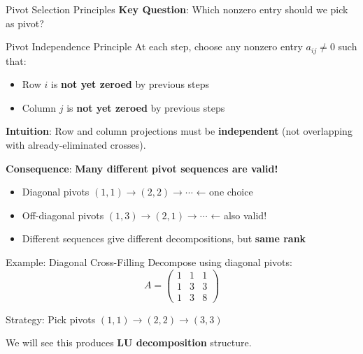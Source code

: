 \documentclass[10pt]{beamer}
\theoremstyle{definition}
\newcommand{\x}[1]{\alert{\textbf{#1}}}
\begin{document}
\begin{frame}{Pivot Selection Principles}
\textbf{Key Question}: Which nonzero entry should we pick as pivot?

\vfill
\begin{alertblock}{Pivot Independence Principle}
At each step, choose any nonzero entry $a_{ij} \neq 0$ such that:
\begin{itemize}
\item Row $i$ is \x{not yet zeroed} by previous steps
\item Column $j$ is \x{not yet zeroed} by previous steps
\end{itemize}
\end{alertblock}

\vfill
\textbf{Intuition}: Row and column projections must be \x{independent} (not overlapping with already-eliminated crosses).

\vfill
\textbf{Consequence}: \x{Many different pivot sequences are valid!}
\begin{itemize}
\item Diagonal pivots $(1,1) \to (2,2) \to \cdots$ ← one choice
\item Off-diagonal pivots $(1,3) \to (2,1) \to \cdots$ ← also valid!
\item Different sequences give different decompositions, but \x{same rank}
\end{itemize}
\end{frame}

\begin{frame}{Example: Diagonal Cross-Filling}
Decompose using diagonal pivots:
$$A = \begin{pmatrix}
1 & 1 & 1 \\
1 & 3 & 3 \\
1 & 3 & 8
\end{pmatrix}$$

\vfill
Strategy: Pick pivots $(1,1) \to (2,2) \to (3,3)$

\vfill
We will see this produces \x{LU decomposition} structure.
\end{frame}
\end{document}
